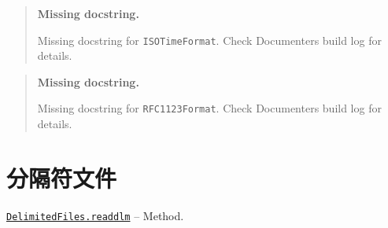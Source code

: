 \begin{quote}
\textbf{Missing docstring.}

Missing docstring for \texttt{ISOTimeFormat}. Check Documenter{\textquotesingle}s build log for details.

\end{quote}


\begin{quote}
\textbf{Missing docstring.}

Missing docstring for \texttt{RFC1123Format}. Check Documenter{\textquotesingle}s build log for details.

\end{quote}




\hypertarget{8991044554794555328}{}


\chapter{分隔符文件}


\hypertarget{3298674071242371865}{}
\hyperlink{3298674071242371865}{\texttt{DelimitedFiles.readdlm}}  -- {Method.}

